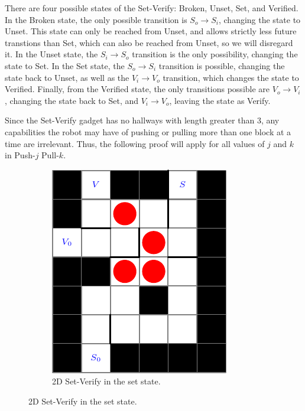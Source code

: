 \documentclass[11pt]{article}
\begin{document}
There are four possible states of the Set-Verify: Broken, Unset, Set, and Verified. In the Broken state, the only possible transition is $S_o \rightarrow S_i$, changing the state to Unset. This state can only be reached from Unset, and allows strictly less future transtions than Set, which can also be reached from Unset, so we will disregard it. In the Unset state, the $S_i \rightarrow S_o$ transition is the only possibility, changing the state to Set. In the Set state, the $S_o \rightarrow S_i$ transition is possible, changing the state back to Unset, as well as the $V_i \rightarrow V_o$ transition, which changes the state to Verified. Finally, from the Verified state, the only transitions possible are $V_o \rightarrow V_i$, changing the state back to Set, and $V_i \rightarrow V_o$, leaving the state as Verify.

Since the Set-Verify gadget has no hallways with length greater than 3, any capabilities the robot may have of pushing or pulling more than one block at a time are irrelevant. Thus, the following proof will apply for all values of $j$ and $k$ in Push-$j$ Pull-$k$.

\begin{figure}[!ht]
  \centering
  \caption{Set-Verify Gadget}
  \begin{subfigure}[b]{0.45\textwidth}
    \includegraphics[width=\textwidth]{SetVerifySet}
    \caption{2D Set-Verify in the set state.}
    \label{ldeDiagrams}
  \end{subfigure}
\end{figure}
\end{document}
